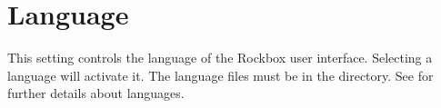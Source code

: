 \section{\label{ref:Language}Language}
  This setting controls the language of the Rockbox user interface. Selecting a
  language will activate it. The language files must be in the 
   directory. See  for 
  further details about languages.
